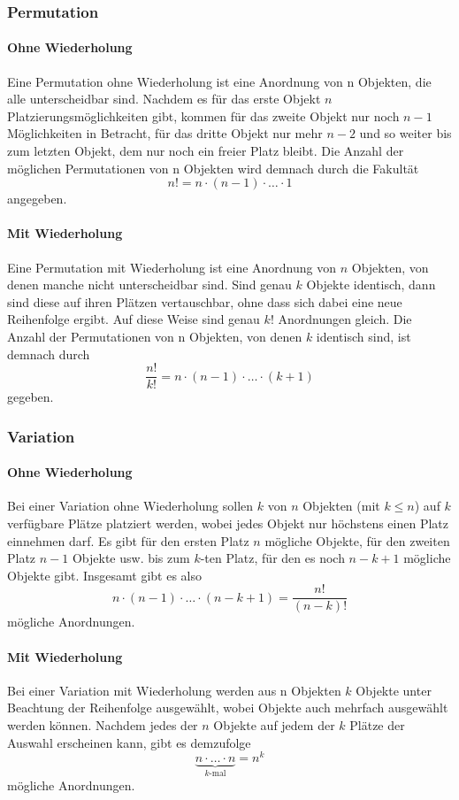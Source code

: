 \documentclass[a4paper,10pt,DIV9, BCOR12mm, oneside,openright,openbib]{scrreprt}
\theoremstyle{definition}
\theoremstyle{plain}
\begin{document}
\subsubsection{Permutation}
\paragraph{Ohne Wiederholung}
Eine Permutation ohne Wiederholung ist eine Anordnung von n Objekten, die alle unterscheidbar sind. Nachdem es für das erste Objekt $ n $ Platzierungsmöglichkeiten gibt, kommen für das zweite Objekt nur noch $ n-1 $ Möglichkeiten in Betracht, für das dritte Objekt nur mehr $ n-2 $ und so weiter bis zum letzten Objekt, dem nur noch ein freier Platz bleibt. Die Anzahl der möglichen Permutationen von n Objekten wird demnach durch die Fakultät
\[ n! = n \cdot (n-1) \cdot \ldots \cdot 1 \]
angegeben.\\

\paragraph{Mit Wiederholung}
Eine Permutation mit Wiederholung ist eine Anordnung von $ n $ Objekten, von denen manche nicht unterscheidbar sind. Sind genau $ k $ Objekte identisch, dann sind diese auf ihren Plätzen vertauschbar, ohne dass sich dabei eine neue Reihenfolge ergibt. Auf diese Weise sind genau $ k! $ Anordnungen gleich. Die Anzahl der Permutationen von n Objekten, von denen $ k $ identisch sind, ist demnach durch
\[ \frac{n!}{k!} = n \cdot (n-1) \cdot \ldots \cdot (k+1) \]
gegeben.\\

\subsubsection{Variation}
\paragraph{Ohne Wiederholung}
Bei einer Variation ohne Wiederholung sollen $ k $ von $ n $ Objekten (mit $ k\leq n $) auf $ k $ verfügbare Plätze platziert werden, wobei jedes Objekt nur höchstens einen Platz einnehmen darf. Es gibt für den ersten Platz $ n $ mögliche Objekte, für den zweiten Platz $ n-1 $ Objekte usw. bis zum $ k $-ten Platz, für den es noch $ n-k+1 $ mögliche Objekte gibt. Insgesamt gibt es also
\[ n\cdot (n-1) \cdot \ldots \cdot (n-k+1) = \frac{n!}{(n-k)!} \]
mögliche Anordnungen.\\
\paragraph{Mit Wiederholung}
Bei einer Variation mit Wiederholung werden aus n Objekten $ k $ Objekte unter Beachtung der Reihenfolge ausgewählt, wobei Objekte auch mehrfach ausgewählt werden können. Nachdem jedes der $ n $ Objekte auf jedem der $ k $ Plätze der Auswahl erscheinen kann, gibt es demzufolge
\[ \underbrace{n \cdot \dotsc \cdot n}_{k\text{-mal}} = n^k \]
mögliche Anordnungen.
\end{document}
